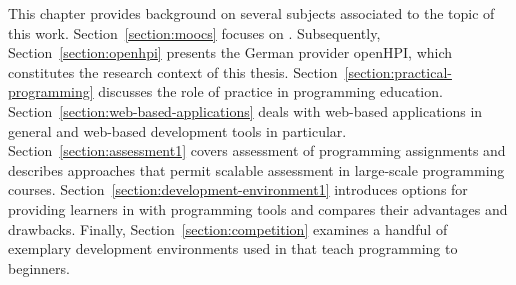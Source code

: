 This chapter provides background on several subjects associated to the topic of this work. Section~\ref{section:moocs} focuses on \moocs. Subsequently, Section~\ref{section:openhpi} presents the German \mooc provider openHPI, which constitutes the research context of this thesis. Section~\ref{section:practical-programming} discusses the role of practice in programming education. Section~\ref{section:web-based-applications} deals with web-based applications in general and web-based development tools in particular. Section~\ref{section:assessment1} covers assessment of programming assignments and describes approaches that permit scalable assessment in large-scale programming courses. Section~\ref{section:development-environment1} introduces options for providing learners in \moocs with programming tools and compares their advantages and drawbacks. Finally, Section~\ref{section:competition} examines a handful of exemplary development environments used in \moocs that teach programming to beginners.
